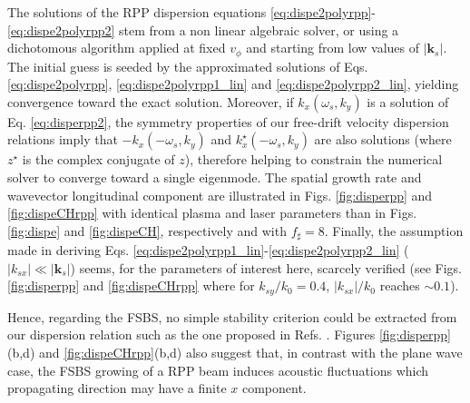 \documentclass[
 reprint,
 superscriptaddress,
 amsmath,amssymb,
 aps,
]{revtex4-1}
\begin{document}
%
The solutions of the RPP dispersion  equations \eqref{eq:dispe2polyrpp}-\eqref{eq:dispe2polyrpp2} stem from a non linear algebraic solver, or using a dichotomous algorithm applied at fixed  $v_\phi$ and starting from low values of $\vert \mathbf{k}_s\vert$. The initial guess is  seeded by the approximated solutions of Eqs. \eqref{eq:dispe2polyrpp}, \eqref{eq:dispe2polyrpp1_lin} and  \eqref{eq:dispe2polyrpp2_lin}, yielding convergence toward the exact solution. Moreover, if $k_x(\omega_s, k_y)$ is a solution of Eq.  \eqref{eq:disperpp2},  the symmetry properties of our free-drift velocity  dispersion relations imply that  
$-k_x(-\omega_s, k_y)$ and $k_x^\star(-\omega_s, k_y)$ are also solutions (where $z^\star$ is the complex conjugate of $z$), therefore  helping to constrain the numerical solver to converge toward a single eigenmode. The spatial growth rate and wavevector longitudinal component are illustrated in  
Figs. \ref{fig:disperpp} and \ref{fig:dispeCHrpp} with identical plasma and laser parameters than in Figs.  \ref{fig:dispe} and \ref{fig:dispeCH}, respectively and with $f_\sharp=8$. Finally, the assumption made in deriving Eqs. \eqref{eq:dispe2polyrpp1_lin}-\eqref{eq:dispe2polyrpp2_lin} ($\vert k_{sx}\vert \ll \vert \mathbf{k}_s\vert$) seems, for the parameters of interest here, scarcely verified (see Figs. \ref{fig:disperpp} and  \ref{fig:dispeCHrpp} where for  $k_{sy}/k_0=0.4 $, $\vert k_{sx}\vert/k_0$ reaches $\sim 0.1$).

Hence, regarding the FSBS, no simple stability criterion could be extracted from our dispersion relation such as the one proposed in Refs. \cite[]{Lushnikov_2006,phd-Grech,PRL_Grech_2009}.
Figures \ref{fig:disperpp}(b,d) and \ref{fig:dispeCHrpp}(b,d) also suggest that, in contrast with the plane wave case, the FSBS growing of a RPP beam induces acoustic fluctuations which propagating direction may  have a finite $x$ component.
\end{document}
